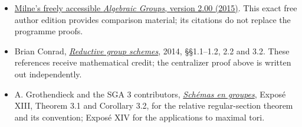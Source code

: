 \documentclass[11pt,a4paper,openany]{report}
\providecommand{\tightlist}{\setlength{\itemsep}{0pt}\setlength{\parskip}{0pt}}
\begin{document}
\begin{itemize}
\tightlist
\item
  \href{https://www.jmilne.org/math/CourseNotes/iAG200.pdf}{Milne's freely accessible \emph{Algebraic Groups}, version 2.00 (2015)}. This exact free author edition provides comparison material; its citations do not replace the programme proofs.
\item
  Brian Conrad, \href{https://math.stanford.edu/~conrad/papers/luminysga3.pdf}{\emph{Reductive group schemes}}, 2014, §§1.1--1.2, 2.2 and 3.2. These references receive mathematical credit; the centralizer proof above is written out independently.
\item
  A. Grothendieck and the SGA 3 contributors, \href{https://webusers.imj-prg.fr/~patrick.polo/SGA3/}{\emph{Schémas en groupes}}, Exposé XIII, Theorem 3.1 and Corollary 3.2, for the relative regular-section theorem and its convention; Exposé XIV for the applications to maximal tori.
\end{itemize}
\end{document}

